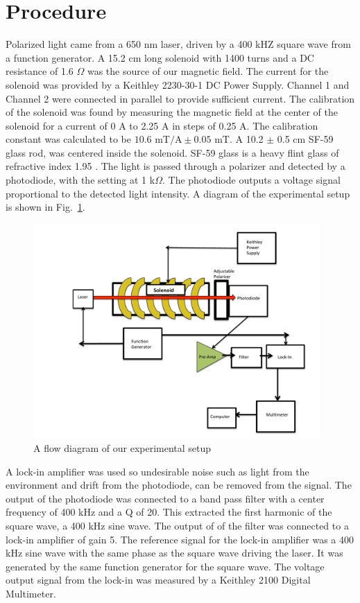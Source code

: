 \documentclass[prb,preprint]{revtex4-1}
\begin{document}
\section{Procedure}
{Polarized light came from a 650 nm laser, driven by a 400 kHZ square wave from a function generator. 
A 15.2 cm long solenoid with 1400 turns and a DC resistance of 1.6 $\Omega$ was the source of our magnetic field. 
The current for the solenoid was provided by a Keithley 2230-30-1 DC Power Supply. Channel 1 and Channel 2 were connected in parallel to provide sufficient current. The calibration of the solenoid was found by measuring the magnetic field at the center of the solenoid for a current of 0 A to 2.25 A in steps of 0.25 A. 
The calibration constant was calculated to be $10.6 \textrm{~mT/A} \pm 0.05 \text{~mT}$. A 10.2 $\pm$ 0.5 cm SF-59 glass rod, was centered inside the solenoid. SF-59 glass is a heavy flint glass of refractive index 1.95 \cite{optics}.  The light is passed through a polarizer and detected by a photodiode, with the setting at 1 k$\Omega$. 
The photodiode outputs a voltage signal proportional to the detected light intensity\cite{teachspin}. A diagram of the experimental setup is shown in Fig.~\ref{setup}.

\begin{figure}
\includegraphics[width = 4.3in]{ExperimentalSetup}
\caption{\label{setup}A flow diagram of our experimental setup}
\end{figure}

A lock-in amplifier was used so undesirable noise such as light from the environment and drift from the photodiode, can be removed from the signal. 
The output of the photodiode was connected to a band pass filter with a center frequency of 400 kHz and a Q of 20. This extracted the first harmonic of the square wave, a 400 kHz sine wave. The output of of the filter was connected to a lock-in amplifier of gain 5. 
The reference signal for the lock-in amplifier was a 400 kHz sine wave with the same phase as the square wave driving the laser. It was generated by the same function generator for the square wave. 
The voltage output signal from the lock-in was measured by a Keithley 2100 Digital Multimeter.

}
\end{document}
